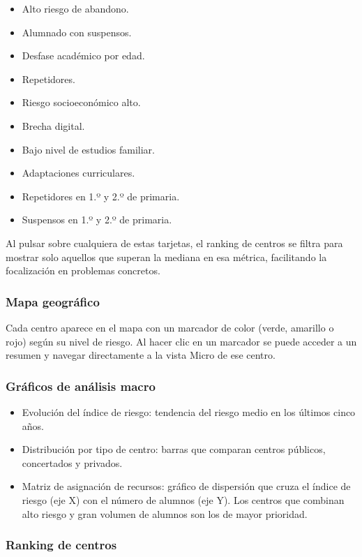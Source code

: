 \begin{itemize}
    \item Alto riesgo de abandono.
    \item Alumnado con suspensos.
    \item Desfase académico por edad.
    \item Repetidores.
    \item Riesgo socioeconómico alto.
    \item Brecha digital.
    \item Bajo nivel de estudios familiar.
    \item Adaptaciones curriculares.
    \item Repetidores en 1.º y 2.º de primaria.
    \item Suspensos en 1.º y 2.º de primaria.
\end{itemize}

Al pulsar sobre cualquiera de estas tarjetas, el ranking de centros se filtra para mostrar solo aquellos que superan la mediana en esa métrica, facilitando la focalización en problemas concretos.

\subsubsection{Mapa geográfico}

Cada centro aparece en el mapa con un marcador de color (verde, amarillo o rojo) según su nivel de riesgo. Al hacer clic en un marcador se puede acceder a un resumen y navegar directamente a la vista Micro de ese centro.

\subsubsection{Gráficos de análisis macro}

\begin{itemize}
    \item Evolución del índice de riesgo: tendencia del riesgo medio en los últimos cinco años.
    \item Distribución por tipo de centro: barras que comparan centros públicos, concertados y privados.
    \item Matriz de asignación de recursos: gráfico de dispersión que cruza el índice de riesgo (eje X) con el número de alumnos (eje Y). Los centros que combinan alto riesgo y gran volumen de alumnos son los de mayor prioridad.
\end{itemize}

\subsubsection{Ranking de centros}

